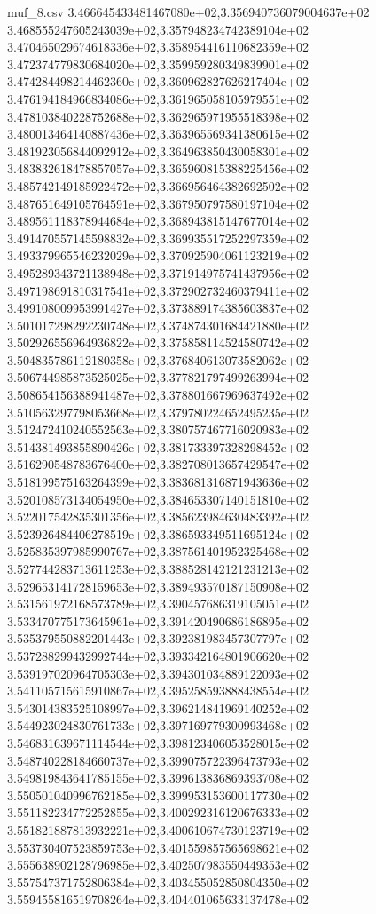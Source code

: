 \begin{filecontents*}{muf_8.csv}
3.466645433481467080e+02,3.356940736079004637e+02
3.468555247605243039e+02,3.357948234742389104e+02
3.470465029674618336e+02,3.358954416110682359e+02
3.472374779830684020e+02,3.359959280349839901e+02
3.474284498214462360e+02,3.360962827626217404e+02
3.476194184966834086e+02,3.361965058105979551e+02
3.478103840228752688e+02,3.362965971955518398e+02
3.480013464140887436e+02,3.363965569341380615e+02
3.481923056844092912e+02,3.364963850430058301e+02
3.483832618478857057e+02,3.365960815388225456e+02
3.485742149185922472e+02,3.366956464382692502e+02
3.487651649105764591e+02,3.367950797580197104e+02
3.489561118378944684e+02,3.368943815147677014e+02
3.491470557145598832e+02,3.369935517252297359e+02
3.493379965546232029e+02,3.370925904061123219e+02
3.495289343721138948e+02,3.371914975741437956e+02
3.497198691810317541e+02,3.372902732460379411e+02
3.499108009953991427e+02,3.373889174385603837e+02
3.501017298292230748e+02,3.374874301684421880e+02
3.502926556964936822e+02,3.375858114524580742e+02
3.504835786112180358e+02,3.376840613073582062e+02
3.506744985873525025e+02,3.377821797499263994e+02
3.508654156388941487e+02,3.378801667969637492e+02
3.510563297798053668e+02,3.379780224652495235e+02
3.512472410240552563e+02,3.380757467716020983e+02
3.514381493855890426e+02,3.381733397328298452e+02
3.516290548783676400e+02,3.382708013657429547e+02
3.518199575163264399e+02,3.383681316871943636e+02
3.520108573134054950e+02,3.384653307140151810e+02
3.522017542835301356e+02,3.385623984630483392e+02
3.523926484406278519e+02,3.386593349511695124e+02
3.525835397985990767e+02,3.387561401952325468e+02
3.527744283713611253e+02,3.388528142121231213e+02
3.529653141728159653e+02,3.389493570187150908e+02
3.531561972168573789e+02,3.390457686319105051e+02
3.533470775173645961e+02,3.391420490686186895e+02
3.535379550882201443e+02,3.392381983457307797e+02
3.537288299432992744e+02,3.393342164801906620e+02
3.539197020964705303e+02,3.394301034889122093e+02
3.541105715615910867e+02,3.395258593888438554e+02
3.543014383525108997e+02,3.396214841969140252e+02
3.544923024830761733e+02,3.397169779300993468e+02
3.546831639671114544e+02,3.398123406053528015e+02
3.548740228184660737e+02,3.399075722396473793e+02
3.549819843641785155e+02,3.399613836869393708e+02
3.550501040996762185e+02,3.399953153600117730e+02
3.551182234772252855e+02,3.400292316120676333e+02
3.551821887813932221e+02,3.400610674730123719e+02
3.553730407523859753e+02,3.401559857565698621e+02
3.555638902128796985e+02,3.402507983550449353e+02
3.557547371752806384e+02,3.403455052850804350e+02
3.559455816519708264e+02,3.404401065633137478e+02

\end{filecontents*}
